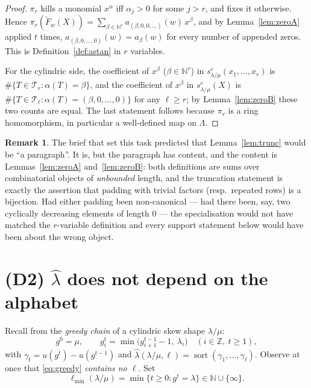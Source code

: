 \documentclass[11pt]{article}
\theoremstyle{plain}
\theoremstyle{definition}
\newtheorem{rem}[thm]{Remark}
\DeclareMathOperator{\sort}{sort}
\newcommand{\Z}{\mathbb{Z}}
\newcommand{\N}{\mathbb{N}}
\newcommand{\Fw}{\widetilde{F}_{w}}
\begin{document}
\begin{proof}
$\pi_r$ kills a monomial $x^\alpha$ iff $\alpha_j>0$ for some $j>r$, and fixes it otherwise.
Hence $\pi_r(\Fw(X))=\sum_{\beta\in\N^{r}}a_{(\beta,0,0,\dots)}(w)\,x^\beta$, and by
Lemma~\ref{lem:zeroA} applied $t$ times, $a_{(\beta,0,\dots,0)}(w)=a_\beta(w)$ for every number
of appended zeros. This is Definition~\ref{def:astan} in $r$ variables.

For the cylindric side, the coefficient of $x^\beta$ ($\beta\in\N^r$) in
$s^{c}_{\lambda/\mu}(x_1,\dots,x_r)$ is $\#\{T\in\mathcal T_r:\alpha(T)=\beta\}$, and the
coefficient of $x^\beta$ in $s^{c}_{\lambda/\mu}(X)$ is
$\#\{T\in\mathcal T_{\ell}:\alpha(T)=(\beta,0,\dots,0)\}$ for any $\ell\ge r$; by
Lemma~\ref{lem:zeroB} these two counts are equal. The last statement follows because $\pi_r$ is
a ring homomorphism, in particular a well-defined map on $\Lambda$.
\end{proof}

\begin{rem}
The brief that set this task predicted that Lemma~\ref{lem:trunc} would be ``a paragraph''.
It is, but the paragraph has content, and the content is Lemmas~\ref{lem:zeroA}
and~\ref{lem:zeroB}: both definitions are sums over combinatorial objects of \emph{unbounded}
length, and the truncation statement is exactly the assertion that padding with trivial
factors (resp.\ repeated rows) is a bijection. Had either padding been non-canonical --- had
there been, say, two cyclically decreasing elements of length $0$ --- the specialisation would
not have matched the $r$-variable definition and every support statement below would have been
about the wrong object.
\end{rem}

\section{(D2) $\hat\lambda$ does not depend on the alphabet}\label{sec:stab}

Recall from \cite[\S5]{Clio2026} the \emph{greedy chain} of a cylindric skew shape
$\lambda/\mu$:
\begin{equation}\label{eq:greedy}
  g^{0}=\mu,\qquad g^{t}_i=\min\bigl(g^{t-1}_{i+1}-1,\ \lambda_i\bigr)\quad(i\in\Z,\ t\ge1),
\end{equation}
with $\gamma_t=u(g^{t})-u(g^{t-1})$ and $\hat\lambda(\lambda/\mu,\ell)=\sort(\gamma_1,\dots,\gamma_\ell)$.
Observe at once that \eqref{eq:greedy} \emph{contains no $\ell$}. Set
\[
  \ell_{\min}(\lambda/\mu)=\min\{t\ge0:g^{t}=\lambda\}\in\N\cup\{\infty\}.
\]
\end{document}
